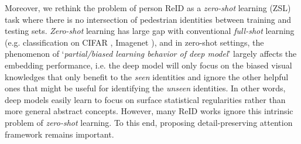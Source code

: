 \documentclass[10pt,twocolumn,letterpaper]{article}
\begin{document}
Moreover, we rethink the problem of person ReID as a \emph{zero-shot} learning (ZSL) task where there is no intersection of pedestrian identities between training and testing sets. \emph{Zero-shot} learning has large gap with conventional \emph{full-shot} learning (e.g. classification on CIFAR \cite{chen2018virtual,Chen_2017_CVPR}, Imagenet \cite{russakovsky2015imagenet}), and in zero-shot settings, the phenomenon of `\emph{partial/biased learning behavior of deep model}' \cite{chen2019energy} largely affects the embedding performance, i.e. the deep model will only focus on the biased visual knowledges that only benefit to the \emph{seen} identities and ignore the other helpful ones that might be useful for identifying the \emph{unseen} identities. In other words, deep models easily learn to focus on surface statistical regularities rather than more general abstract concepts. However, many ReID works ignore this intrinsic problem of \emph{zero-shot} learning. To this end, proposing detail-preserving attention framework remains important.
\end{document}
